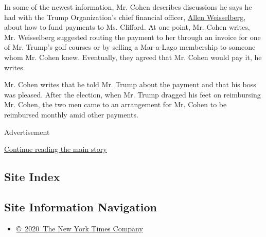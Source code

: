 In some of the newest information, Mr. Cohen describes discussions he
says he had with the Trump Organization's chief financial officer,
\href{https://www.nytimes3xbfgragh.onion/2019/02/28/nyregion/allen-weisselberg-facts-history.html}{Allen
Weisselberg}, about how to fund payments to Ms. Clifford. At one point,
Mr. Cohen writes, Mr. Weisselberg suggested routing the payment to her
through an invoice for one of Mr. Trump's golf courses or by selling a
Mar-a-Lago membership to someone whom Mr. Cohen knew. Eventually, they
agreed that Mr. Cohen would pay it, he writes.

Mr. Cohen writes that he told Mr. Trump about the payment and that his
boss was pleased. After the election, when Mr. Trump dragged his feet on
reimbursing Mr. Cohen, the two men came to an arrangement for Mr. Cohen
to be reimbursed monthly amid other payments.

Advertisement

\protect\hyperlink{after-bottom}{Continue reading the main story}

\hypertarget{site-index}{%
\subsection{Site Index}\label{site-index}}

\hypertarget{site-information-navigation}{%
\subsection{Site Information
Navigation}\label{site-information-navigation}}

\begin{itemize}
\tightlist
\item
  \href{https://help.nytimes3xbfgragh.onion/hc/en-us/articles/115014792127-Copyright-notice}{©~2020~The
  New York Times Company}
\end{itemize}

